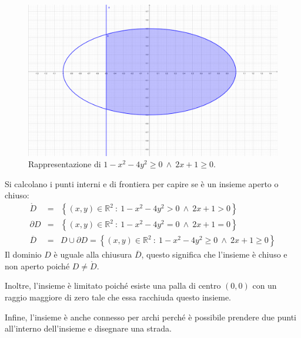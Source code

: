 \documentclass[a4paper]{article}
\begin{document}
	\begin{figure}[!htp]
		\centering
		\includegraphics[width=\textwidth]{img/exercise/2023-09-06-A-ex3(a).pdf}
		\caption*{Rappresentazione di $1 - x^{2} - 4y^{2} \ge 0 \: \land \: 2x + 1 \ge 0$.}
	\end{figure}

	\noindent
	Si calcolano i punti interni e di frontiera per capire se è un insieme aperto o chiuso:
	\begin{equation*}
		\begin{array}{rcl}
			\mathring{D} &=& \left\{\left(x,y\right) \in \mathbb{R}^{2} \: : \: 1 - x^{2} - 4y^{2} > 0 \: \land \: 2x + 1 > 0\right\} \\ [.8em]
			\partial D &=& \left\{\left(x,y\right) \in \mathbb{R}^{2} \: : \: 1 - x^{2} - 4y^{2} = 0 \: \land \: 2x + 1 = 0\right\} \\ [.8em]
			\overline{D} &=& D \cup \partial D = \left\{\left(x,y\right) \in \mathbb{R}^{2} \: : \: 1 - x^{2} - 4y^{2} \ge 0 \: \land \: 2x + 1 \ge 0\right\}
		\end{array}
	\end{equation*}
	Il dominio $D$ è uguale alla chiusura $\overline{D}$, questo significa che l'insieme è chiuso e non aperto poiché $D \ne \mathring{D}$.

	Inoltre, l'insieme è limitato poiché esiste una palla di centro $\left(0,0\right)$ con un raggio maggiore di zero tale che essa racchiuda questo insieme.

	Infine, l'insieme è anche connesso per archi perché è possibile prendere due punti all'interno dell'insieme e disegnare una strada.\newpage
\end{document}
